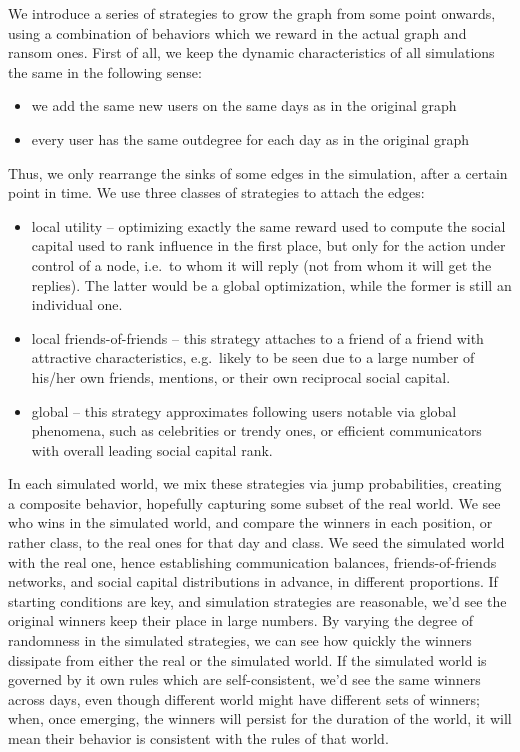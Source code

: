 \documentclass[10pt,oneside]{memoir}
\begin{document}
We introduce a series of strategies to grow the graph from some point onwards, using a combination of behaviors which we reward in the actual graph and ransom ones.  First of all, we keep the dynamic characteristics of all simulations the same in the following sense:


\begin{itemize}


\item we add the same new users on the same days as in the original graph

\item every user has the same outdegree for each day as in the original graph
\end{itemize}

Thus, we only rearrange the sinks of some edges in the simulation, after a certain point in time.  We use three classes of strategies to attach the edges:


\begin{itemize}


\item local utility -- optimizing exactly the same reward used to compute the social capital used to rank influence in the first place, but only for the action under control of a node, i.e.\ to whom it will reply (not from whom it will get the replies).  The latter would be a global optimization, while the former is still an individual one.

\item local friends-of-friends -- this strategy attaches to a friend of a friend with attractive characteristics, e.g.\ likely to be seen due to a large number of his/her own friends, mentions, or their own reciprocal social capital.

\item global -- this strategy approximates following users notable via global phenomena, such as celebrities or trendy ones, or efficient communicators with overall leading social capital rank.
\end{itemize}

In each simulated world, we mix these strategies via jump probabilities, creating a composite behavior, hopefully capturing some subset of the real world.  We see who wins in the simulated world, and compare the winners in each position, or rather class, to the real ones for that day and class.  We seed the simulated world with the real one, hence establishing communication balances, friends-of-friends networks, and social capital distributions in advance, in different proportions.  If starting conditions are key, and simulation strategies are reasonable, we'd see the original winners keep their place in large numbers.  By varying the degree of randomness in the simulated strategies, we can see how quickly the winners dissipate from either the real or the simulated world.  If the simulated world is governed by it own rules which are self-consistent, we'd see the same winners across days, even though different world might have different sets of winners; when, once emerging, the winners will persist for the duration of the world, it will mean their behavior is consistent with the rules of that world.
\end{document}
